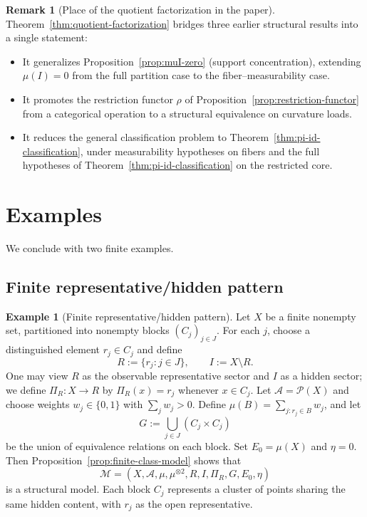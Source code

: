 \documentclass[11pt]{article}
\numberwithin{equation}{section}
\theoremstyle{definition}
\newtheorem{remark}[theorem]{Remark}
\newtheorem{example}[theorem]{Example}
\begin{document}
\begin{remark}[Place of the quotient factorization in the paper]\label{rem:place-quotient}
\sloppy
Theorem~\ref{thm:quotient-factorization} bridges three earlier structural results into a single statement:
\begin{itemize}[nosep]
\item It generalizes Proposition~\ref{prop:muI-zero} (support concentration), extending $\mu(I)=0$ from the full partition case to the fiber--measurability case.
\item It promotes the restriction functor $\rho$ of Proposition~\ref{prop:restriction-functor} from a categorical operation to a structural equivalence on curvature loads.
\item It reduces the general classification problem to Theorem~\ref{thm:pi-id-classification}, under measurability hypotheses on fibers and the full hypotheses of Theorem~\ref{thm:pi-id-classification} on the restricted core.
\end{itemize}
\end{remark}


\section{Examples}
We conclude with two finite examples.
\subsection{Finite representative/hidden pattern}
\begin{example}[Finite representative/hidden pattern]
\sloppy
Let $X$ be a finite nonempty set, partitioned into nonempty blocks
$(C_j)_{j\in J}$.
For each $j$, choose a distinguished element $r_j\in C_j$ and define
\[
R := \{r_j : j\in J\},\qquad I := X\setminus R.
\]
One may view $R$ as the observable representative sector and $I$ as a hidden sector; we define $\Pi_R:X\to R$ by $\Pi_R(x)=r_j$ whenever $x\in C_j$.
Let $\mathcal A=\mathcal P(X)$ and choose weights $w_j\in\{0,1\}$ with $\sum_j w_j>0$.
Define $\mu(B)=\sum_{j : r_j\in B} w_j$, and let
\[
G := \bigcup_{j\in J} (C_j\times C_j)
\]
be the union of equivalence relations on each block.
Set $E_0=\mu(X)$ and $\eta=0$.
Then Proposition~\ref{prop:finite-class-model} shows that
\[
\mathcal M=(X,\mathcal A,\mu,\mu^{\otimes2},R,I,\Pi_R,G,E_0,\eta)
\]
is a structural model.
Each block $C_j$ represents a cluster of points sharing the same hidden content, with $r_j$ as the open representative.
\end{example}
\end{document}
